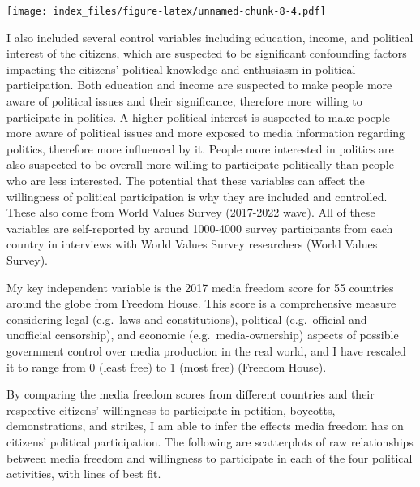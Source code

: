 \documentclass[
]{article}
\begin{document}
\texttt{[image: index\_files/figure-latex/unnamed-chunk-8-4.pdf]}

I also included several control variables including education, income,
and political interest of the citizens, which are suspected to be
significant confounding factors impacting the citizens' political
knowledge and enthusiasm in political participation. Both education and
income are suspected to make people more aware of political issues and
their significance, therefore more willing to participate in politics. A
higher political interest is suspected to make poeple more aware of
political issues and more exposed to media information regarding
politics, therefore more influenced by it. People more interested in
politics are also suspected to be overall more willing to participate
politically than people who are less interested. The potential that
these variables can affect the willingness of political participation is
why they are included and controlled. These also come from World Values
Survey (2017-2022 wave). All of these variables are self-reported by
around 1000-4000 survey participants from each country in interviews
with World Values Survey researchers (World Values Survey).

My key independent variable is the 2017 media freedom score for 55
countries around the globe from Freedom House. This score is a
comprehensive measure considering legal (e.g.~laws and constitutions),
political (e.g.~official and unofficial censorship), and economic
(e.g.~media-ownership) aspects of possible government control over media
production in the real world, and I have rescaled it to range from 0
(least free) to 1 (most free) (Freedom House).

By comparing the media freedom scores from different countries and their
respective citizens' willingness to participate in petition, boycotts,
demonstrations, and strikes, I am able to infer the effects media
freedom has on citizens' political participation. The following are
scatterplots of raw relationships between media freedom and willingness
to participate in each of the four political activities, with lines of
best fit.
\end{document}
